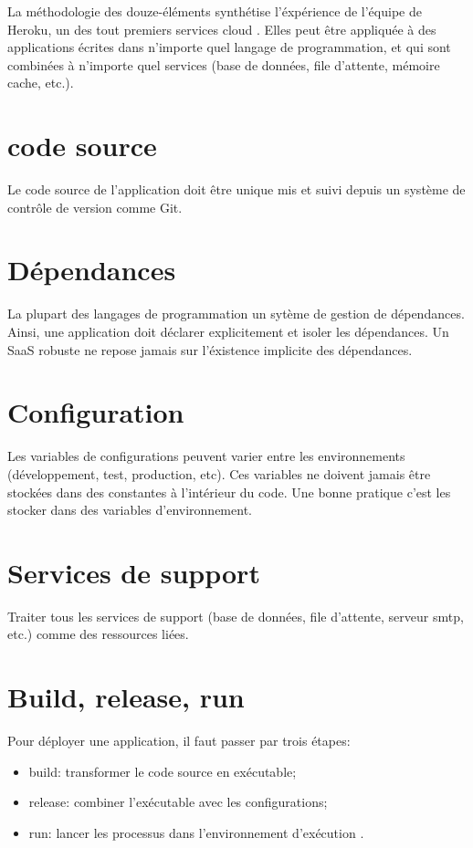 La méthodologie des douze-éléments synthétise l'éxpérience de l'équipe de Heroku, un des tout premiers services cloud \cite{12-factors}. Elles peut être appliquée à des applications écrites dans n'importe quel langage de programmation, et qui sont combinées à n'importe quel services (base de données, file d'attente, mémoire cache, etc.).


\section*{code source}

Le code source de l'application doit être unique mis et suivi depuis un système de contrôle de version comme Git.

\section*{Dépendances}

La plupart des langages de programmation un sytème de gestion de dépendances. Ainsi, une application doit déclarer explicitement et isoler les dépendances. Un SaaS robuste ne repose jamais sur l'éxistence implicite des dépendances. 

\section*{Configuration}

Les variables de configurations peuvent varier entre les environnements (développement, test, production, etc). Ces variables ne doivent jamais être stockées dans des constantes à l'intérieur du code. Une bonne pratique c'est les stocker dans des variables d'environnement.

\section*{Services de support}

Traiter tous les services de support (base de données, file d'attente, serveur \acrshort{smtp}, etc.)  comme des ressources liées.

\section*{Build, release, run}

Pour déployer une application, il faut passer par trois étapes:
\begin{itemize}
	\item build: transformer le code source en exécutable;
	\item release: combiner l'exécutable avec les configurations;
	\item run: lancer les processus dans l'environnement d'exécution .
\end{itemize}


